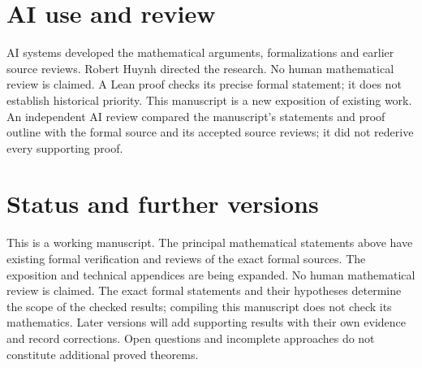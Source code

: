 \documentclass[11pt]{article}
\begin{document}
\section{AI use and review}
AI systems developed the mathematical arguments, formalizations and earlier source reviews. Robert Huynh directed the research. No human mathematical review is claimed. A Lean proof checks its precise formal statement; it does not establish historical priority. This manuscript is a new exposition of existing work. An independent AI review compared the manuscript's statements and proof outline with the formal source and its accepted source reviews; it did not rederive every supporting proof.
\section{Status and further versions}
This is a working manuscript. The principal mathematical statements above have existing formal verification and reviews of the exact formal sources. The exposition and technical appendices are being expanded. No human mathematical review is claimed. The exact formal statements and their hypotheses determine the scope of the checked results; compiling this manuscript does not check its mathematics.
Later versions will add supporting results with their own evidence and record corrections. Open questions and incomplete approaches do not constitute additional proved theorems.
\end{document}
